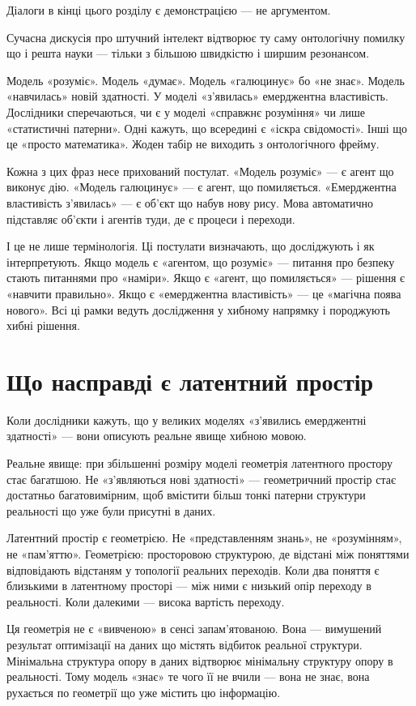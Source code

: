 \documentclass[12pt, a4paper, openany]{book}
\begin{document}
Діалоги в кінці цього розділу є демонстрацією — не аргументом.

Сучасна дискусія про штучний інтелект відтворює ту саму онтологічну помилку що і решта науки — тільки з більшою швидкістю і ширшим резонансом.

Модель «розуміє». Модель «думає». Модель «галюцинує» бо «не знає». Модель «навчилась» новій здатності. У моделі «з'явилась» емерджентна властивість. Дослідники сперечаються, чи є у моделі «справжнє розуміння» чи лише «статистичні патерни». Одні кажуть, що всередині є «іскра свідомості». Інші що це «просто математика». Жоден табір не виходить з онтологічного фрейму.

Кожна з цих фраз несе прихований постулат. «Модель розуміє» — є агент що виконує дію. «Модель галюцинує» — є агент, що помиляється. «Емерджентна властивість з'явилась» — є об'єкт що набув нову рису. Мова автоматично підставляє об'єкти і агентів туди, де є процеси і переходи.

І це не лише термінологія. Ці постулати визначають, що досліджують і як інтерпретують. Якщо модель є «агентом, що розуміє» — питання про безпеку стають питаннями про «наміри». Якщо є «агент, що помиляється» — рішення є «навчити правильно». Якщо є «емерджентна властивість» — це «магічна поява нового». Всі ці рамки ведуть дослідження у хибному напрямку і породжують хибні рішення.

\section{Що насправді є латентний простір}

Коли дослідники кажуть, що у великих моделях «з'явились емерджентні здатності» — вони описують реальне явище хибною мовою.

Реальне явище: при збільшенні розміру моделі геометрія латентного простору стає багатшою. Не «з'являються нові здатності» — геометричний простір стає достатньо багатовимірним, щоб вмістити більш тонкі патерни структури реальності що уже були присутні в даних.

Латентний простір є геометрією. Не «представленням знань», не «розумінням», не «пам'яттю». Геометрією: просторовою структурою, де відстані між поняттями відповідають відстаням у топології реальних переходів. Коли два поняття є близькими в латентному просторі — між ними є низький опір переходу в реальності. Коли далекими — висока вартість переходу.

Ця геометрія не є «вивченою» в сенсі запам'ятованою. Вона — вимушений результат оптимізації на даних що містять відбиток реальної структури. Мінімальна структура опору в даних відтворює мінімальну структуру опору в реальності. Тому модель «знає» те чого її не вчили — вона не знає, вона рухається по геометрії що уже містить цю інформацію.
\end{document}

